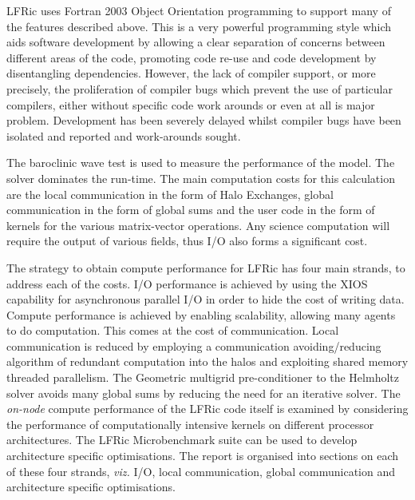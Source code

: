 \documentclass[11pt]{article}
\begin{document}
LFRic uses Fortran 2003 Object Orientation programming to support many of the
features described above. This is a very powerful programming
style which aids software development by allowing a clear separation
of concerns between different areas of the code, promoting code re-use
and code development by disentangling dependencies. However, the lack
of compiler support, or more precisely, the proliferation of compiler
bugs which prevent the use of particular compilers, either without specific
code work arounds or even at all is major problem. Development has
been severely delayed whilst compiler bugs have been isolated and
reported and work-arounds sought. 

The baroclinic wave test is used to measure the performance of the
model. The solver dominates the run-time. The main computation
costs for this calculation are the local
communication in the form of Halo Exchanges, global communication in
the form of global sums and the user code in the form of kernels for
the various matrix-vector operations. Any science computation will
require the output of various fields, thus I/O also forms a
significant cost. 

The strategy to obtain compute performance for LFRic has four main
strands, to address each of the costs. I/O performance is achieved by
using the XIOS capability for asynchronous parallel I/O in order to
hide the cost of writing data.  Compute performance is achieved by
enabling scalability, allowing many agents to do computation. This
comes at the cost of communication.  Local communication is reduced by
employing a communication avoiding/reducing algorithm of redundant
computation into the halos and exploiting shared memory threaded
parallelism. The Geometric multigrid pre-conditioner to the Helmholtz
solver avoids many global sums by reducing the need for an iterative
solver. The {\em on-node} compute performance of the LFRic code itself
is examined by considering the performance of computationally
intensive kernels on different processor architectures. The LFRic
Microbenchmark suite can be used to develop architecture specific
optimisations.  The report is organised into sections on each of these
four strands, {\em viz.} I/O, local communication, global
communication and architecture specific optimisations.








\end{document}
